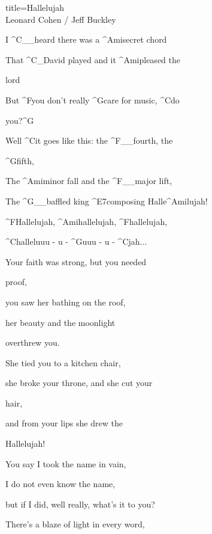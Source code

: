 \begin{song}{title=\predtitle\centering Hallelujah \\\large Leonard Cohen / Jeff Buckley \vspace*{-0.3cm}}  %
\begin{centerjustified}

\begin{varwidth}[t]{0.48\textwidth}\setlength{\parindent}{0.45cm}  %

\sloka
	I ^{C{\color{white}\_\_}}heard there was a ^{Ami}secret chord  
	
	That ^{C{\color{white}\_}}David played and it ^{Ami}pleased the 

	lord  
	
	But ^{F}you don't really ^{G}care for music, ^{C}do 

	you?^{G}  
	
	Well ^{C}it goes like this: the ^{F{\color{white}\_\_}}fourth, the 

	^{G}fifth,  
	
	The ^{Ami}minor fall and the ^{F{\color{white}\_\_}}major lift,  
	
	The ^{G{\color{white}\_\_}}baffled king ^{E7}composing Halle^{Ami}lujah!  
	

	^{F}Hallelujah, ^{Ami}hallelujah, ^{F}hallelujah,
	
	^{C}halleluuu - u - ^{G}uuu - u - ^{C}jah\elipsa.\elipsa.\elipsa.  

\sloka
	Your faith was strong, but you needed 
	
	proof,  
	
	you saw her bathing on the roof,  
	
	her beauty and the moonlight 
	
	overthrew you.  
	
	She tied you to a kitchen chair,  
	
	she broke your throne, and she cut your 

	hair,  
	
	and from your lips she drew the 

	Hallelujah!  




\sloka
	You say I took the name in vain,  
	
	I do not even know the name,  
	
	but if I did, well really, what's it to you?  
	
	There's a blaze of light in every word,  


\end{varwidth}
\end{centerjustified}
\end{song}

